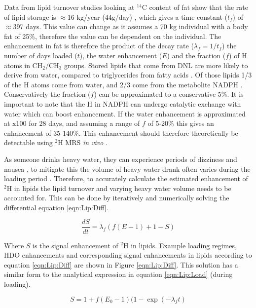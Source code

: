 Data from lipid turnover studies looking at $^{14}$C content of fat show that the rate of lipid storage is $\approx$16 kg/year (44g/day) \cite{Arner2011DynamicsDisease, Spalding2017ImpactTissue}, which gives a time constant ($t_f$) of $\approx$397 days. This value can change as it assumes a 70 kg individual with a body fat of 25\%, therefore the value can be dependent on the individual. The enhancement in fat is therefore the product of the decay rate ($\lambda_f = 1/t_f$) the number of days loaded ($t$), the water enhancement ($E$) and the fraction ($f$) of H atoms in CH$_2$/CH$_3$ groups. Stored lipids that come from \ac{DNL} are more likely to derive from water, compared to triglycerides from fatty acids \cite{Strawford2004AdiposeO}. Of those lipids 1/3 of the H atoms come from water, and 2/3 come from the metabolite NADPH \cite{Zhang2017ChemicalNADPH}. Conservatively the fraction ($f$) can be approximated to a conservative 5\%. It is important to note that the H in NADPH can undergo catalytic exchange with water which can boost enhancement. If the water enhancement is approximated at x100 for 28 days, and assuming a range of $f$ of 5-20\% this gives an enhancement of 35-140\%. This enhancement should therefore theoretically be detectable using $^2$H MRS \textit{in vivo} \cite{Brereton1986PreliminarySpectroscopy}. 

As someone drinks heavy water, they can experience periods of dizziness and nausea \cite{Money1974HeavyAlcohol}, to mitigate this the volume of heavy water drank often varies during the loading period \cite{Strawford2004AdiposeO, Cocking2023DeuteriumDosing}. Therefore, to accurately calculate the estimated enhancement of $^2$H in lipids the lipid turnover and varying heavy water volume needs to be accounted for. This can be done by iteratively and numerically solving the differential equation \ref{eqn:Lip:Diff}.

\begin{equation}
    \frac{dS}{dt} = \lambda_f(f(E-1)+1-S)
    \label{eqn:Lip:Diff}
\end{equation}

Where $S$ is the signal enhancement of $^2$H in lipids. Example loading regimes, \ac{HDO} enhancements and corresponding signal enhancements in lipids according to equation \ref{eqn:Lip:Diff} are shown in Figure \ref{eqn:Lip:Diff}. This solution has a similar form to the analytical expression in equation \ref{eqn:Lip:Load} (during loading).

\begin{equation}
    S = 1 + f(E_0 - 1)(1 - \exp(-\lambda_ft)
    \label{eqn:Lip:Load}
\end{equation}

